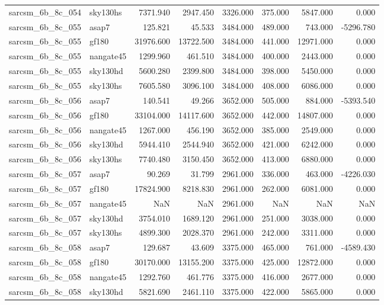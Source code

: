 \begin{tabular}{llrrrrrr}
sarcsm\_6b\_8c\_054 & sky130hs & 7371.940 & 2947.450 & 3326.000 & 375.000 & 5847.000 & 0.000 \\
sarcsm\_6b\_8c\_055 & asap7 & 125.821 & 45.533 & 3484.000 & 489.000 & 743.000 & -5296.780 \\
sarcsm\_6b\_8c\_055 & gf180 & 31976.600 & 13722.500 & 3484.000 & 441.000 & 12971.000 & 0.000 \\
sarcsm\_6b\_8c\_055 & nangate45 & 1299.960 & 461.510 & 3484.000 & 400.000 & 2443.000 & 0.000 \\
sarcsm\_6b\_8c\_055 & sky130hd & 5600.280 & 2399.800 & 3484.000 & 398.000 & 5450.000 & 0.000 \\
sarcsm\_6b\_8c\_055 & sky130hs & 7605.580 & 3096.100 & 3484.000 & 408.000 & 6086.000 & 0.000 \\
sarcsm\_6b\_8c\_056 & asap7 & 140.541 & 49.266 & 3652.000 & 505.000 & 884.000 & -5393.540 \\
sarcsm\_6b\_8c\_056 & gf180 & 33104.000 & 14117.600 & 3652.000 & 442.000 & 14807.000 & 0.000 \\
sarcsm\_6b\_8c\_056 & nangate45 & 1267.000 & 456.190 & 3652.000 & 385.000 & 2549.000 & 0.000 \\
sarcsm\_6b\_8c\_056 & sky130hd & 5944.410 & 2544.940 & 3652.000 & 421.000 & 6242.000 & 0.000 \\
sarcsm\_6b\_8c\_056 & sky130hs & 7740.480 & 3150.450 & 3652.000 & 413.000 & 6880.000 & 0.000 \\
sarcsm\_6b\_8c\_057 & asap7 & 90.269 & 31.799 & 2961.000 & 336.000 & 463.000 & -4226.030 \\
sarcsm\_6b\_8c\_057 & gf180 & 17824.900 & 8218.830 & 2961.000 & 262.000 & 6081.000 & 0.000 \\
sarcsm\_6b\_8c\_057 & nangate45 & NaN & NaN & 2961.000 & NaN & NaN & NaN \\
sarcsm\_6b\_8c\_057 & sky130hd & 3754.010 & 1689.120 & 2961.000 & 251.000 & 3038.000 & 0.000 \\
sarcsm\_6b\_8c\_057 & sky130hs & 4899.300 & 2028.370 & 2961.000 & 242.000 & 3311.000 & 0.000 \\
sarcsm\_6b\_8c\_058 & asap7 & 129.687 & 43.609 & 3375.000 & 465.000 & 761.000 & -4589.430 \\
sarcsm\_6b\_8c\_058 & gf180 & 30170.000 & 13155.200 & 3375.000 & 425.000 & 12872.000 & 0.000 \\
sarcsm\_6b\_8c\_058 & nangate45 & 1292.760 & 461.776 & 3375.000 & 416.000 & 2677.000 & 0.000 \\
sarcsm\_6b\_8c\_058 & sky130hd & 5821.690 & 2461.110 & 3375.000 & 422.000 & 5865.000 & 0.000 \\

\end{tabular}
